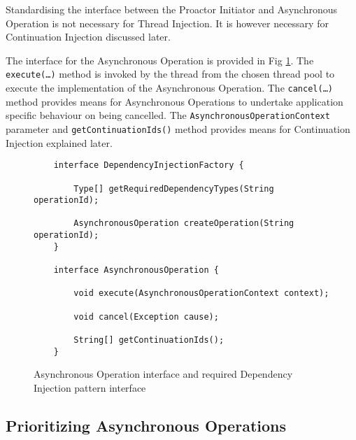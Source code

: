 \documentclass[prodmode]{style/acmlarge}
\begin{document}
Standardising the interface between the Proactor Initiator and Asynchronous
Operation is not necessary for Thread Injection.  It is however necessary for
Continuation Injection discussed later.

The interface for the Asynchronous Operation is provided in Fig
\ref{fig:AO_interface_AOP}.  The \texttt{execute(\ldots)} method is invoked by
the thread from the chosen thread pool to execute the implementation of the
Asynchronous Operation.  The \texttt{cancel(\ldots)} method provides means for
Asynchronous Operations to undertake application specific behaviour on being
cancelled.  The \texttt{AsynchronousOperationContext} parameter and
\texttt{getContinuationIds()} method provides means for Continuation Injection
explained later.

\begin{figure}[tp]
\centering
\begin{verbatim}
    interface DependencyInjectionFactory {
    
        Type[] getRequiredDependencyTypes(String operationId);
        
        AsynchronousOperation createOperation(String operationId);
    }

    interface AsynchronousOperation {
    
        void execute(AsynchronousOperationContext context);
        
        void cancel(Exception cause);
        
        String[] getContinuationIds();
    }
\end{verbatim}
\caption{Asynchronous Operation interface and required Dependency Injection pattern interface\footnotemark}
\label{fig:AO_interface_AOP}
\end{figure}


\subsection{Prioritizing Asynchronous Operations}
\end{document}
